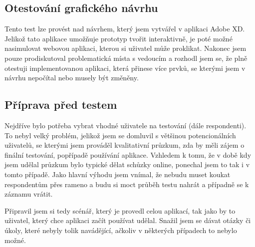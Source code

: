 \subsection{Otestování grafického návrhu}

Tento test lze provést nad návrhem, který jsem vytvářel v aplikaci Adobe XD. Jelikož tato aplikace umožňuje prototyp tvořit interaktivně,
je poté možné nasimulovat webovou aplikaci, kterou si uživatel může proklikat. Nakonec jsem pouze prodiskutoval problematická místa s vedoucím a rozhodl jsem
se, že plně otestuji implementovanou aplikaci, která přinese více prvků, se kterými jsem v návrhu nepočítal nebo musely být změněny.

\subsection{Příprava před testem}

Nejdříve bylo potřeba vybrat vhodné uživatele na testování (dále respondenti). To nebyl velký problém, jelikož jsem se domluvil s většinou potencionálních
uživatelů, se kterými jsem prováděl kvalitativní průzkum, zda by měli zájem o finální testování, popřípadě používání aplikace.
Vzhledem k tomu, že v době kdy jsem udělal průzkum bylo typické dělat schůzky online, ponechal jsem to tak i v tomto případě.
Jako hlavní výhodu jsem vnímal, že nebudu muset koukat respondentům přes rameno a budu si moct průběh testu nahrát a případně se
k záznamu vrátit.

Připravil jsem si tedy scénář, který je provedl celou aplikací, tak jako by to uživatel, který chce aplikaci začít používat udělal.
Snažil jsem se dávat otázky či úkoly, které nebyly tolik navádějící, ačkoliv v některých případech to nebylo možné.

